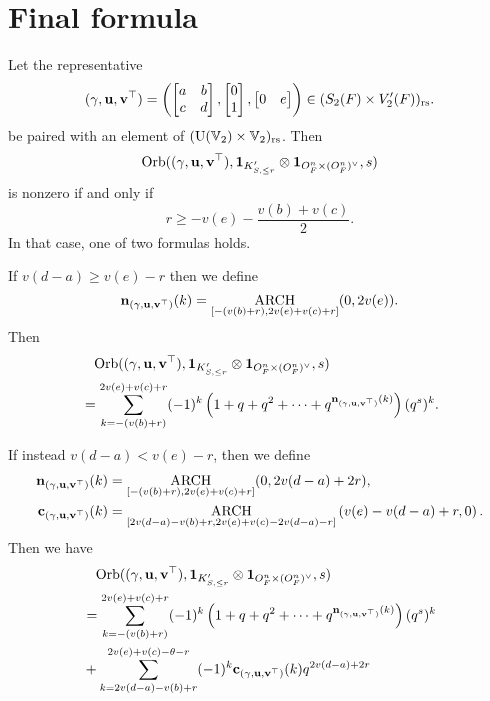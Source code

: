 \section{Final formula}
\begin{theorem}
  Let the representative
  \[
    {(\gamma, \mathbf u, \mathbf v^\top)} = \left( \begin{bmatrix} a & b \\ c & d \end{bmatrix},
      \begin{bmatrix} 0 \\ 1 \end{bmatrix},
      \begin{bmatrix} 0 & e \end{bmatrix} \right)
    \in (S_2(F) \times V_2'(F))_{\mathrm{rs}}.
  \]
  be paired with an element of $(\operatorname{U}(\mathbb V_2) \times \mathbb V_2)_{\mathrm{rs}}$.
  Then
  \[ \operatorname{Orb}({(\gamma, \mathbf u, \mathbf v^\top)}, \mathbf{1}_{K'_{S, \le r}} \otimes \mathbf{1}_{O_F^n \times (O_F^n)^\vee}, s) \]
  is nonzero if and only if
  \[ r \ge -v(e) - \frac{v(b)+v(c)}{2}. \]
  In that case, one of two formulas holds.

  If $v(d-a) \ge v(e) - r$ then we define
  \[ \mathbf n_{(\gamma, \mathbf u, \mathbf v^\top)}(k) = \operatorname*{ARCH}_{[-(v(b)+r), 2v(e)+v(c)+r]}(0, 2v(e)). \]
  Then
  \begin{align*}
    &\phantom= \Orb(\guv, \mathbf{1}_{K'_{S, \le r}} \otimes \oneV, s) \\
    &= \sum_{k = -(v(b)+r)}^{2v(e)+v(c)+r} (-1)^k
    \left( 1 + q + q^2 + \dots + q^{\nn_\guv(k)} \right) (q^s)^k.
  \end{align*}

  If instead $v(d-a) < v(e) - r$, then we define
  \begin{align*}
    \mathbf n_{(\gamma, \mathbf u, \mathbf v^\top)}(k)
      &= \operatorname*{ARCH}_{[-(v(b)+r), 2v(e)+v(c)+r]}(0, 2v(d-a) + 2r), \\
    \mathbf c_{(\gamma, \mathbf u, \mathbf v^\top)}(k) &=
      \operatorname*{ARCH}_{[2v(d-a)-v(b)+r, 2v(e)+v(c)-2v(d-a)-r]}\left( v(e) - v(d-a) + r, 0 \right).
  \end{align*}
  Then we have
  \begin{align*}
    &\phantom= \Orb(\guv, \mathbf{1}_{K'_{S, \le r}} \otimes \oneV, s) \\
    &= \sum_{k = -(v(b)+r)}^{2v(e)+v(c)+r} (-1)^k
    \left( 1 + q + q^2 + \dots + q^{\nn_\guv(k)} \right) (q^s)^k \\
    &+ \sum_{k = 2v(d-a)-v(b)+r}^{2v(e)+v(c)-\theta-r} (-1)^k \cc_\guv(k) q^{2v(d-a) + 2r}
  \end{align*}
\end{theorem}

